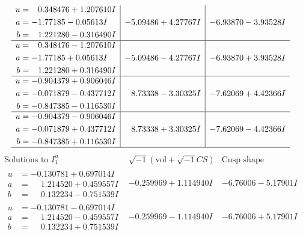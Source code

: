 \documentclass[1p]{elsarticle_modified}
\theoremstyle{definition}
\newcommand{\I}{\sqrt{-1}}
\begin{document}
$$\begin{array}{c|c|c}
\begin{aligned}
u &= \phantom{-}0.348476 + 1.207610 I \\
a &= -1.77185 - 0.05613 I \\
b &= \phantom{-}1.221280 - 0.316490 I\end{aligned}
 & -5.09486 + 4.27767 I & -6.93870 - 3.93528 I \\ \hline\begin{aligned}
u &= \phantom{-}0.348476 - 1.207610 I \\
a &= -1.77185 + 0.05613 I \\
b &= \phantom{-}1.221280 + 0.316490 I\end{aligned}
 & -5.09486 - 4.27767 I & -6.93870 + 3.93528 I \\ \hline\begin{aligned}
u &= -0.904379 + 0.906046 I \\
a &= -0.071879 - 0.437712 I \\
b &= -0.847385 - 0.116530 I\end{aligned}
 & \phantom{-}8.73338 - 3.30325 I & -7.62069 + 4.42366 I \\ \hline\begin{aligned}
u &= -0.904379 - 0.906046 I \\
a &= -0.071879 + 0.437712 I \\
b &= -0.847385 + 0.116530 I\end{aligned}
 & \phantom{-}8.73338 + 3.30325 I & -7.62069 - 4.42366 I\\
 \hline 
 \end{array}$$\newpage$$\begin{array}{c|c|c}  
\text{Solutions to }I^u_{1}& \I (\text{vol} + \sqrt{-1}CS) & \text{Cusp shape}\\
 \hline 
\begin{aligned}
u &= -0.130781 + 0.697014 I \\
a &= \phantom{-}1.214520 + 0.459557 I \\
b &= \phantom{-}0.132234 - 0.751539 I\end{aligned}
 & -0.259969 + 1.114940 I & -6.76006 - 5.17901 I \\ \hline\begin{aligned}
u &= -0.130781 - 0.697014 I \\
a &= \phantom{-}1.214520 - 0.459557 I \\
b &= \phantom{-}0.132234 + 0.751539 I\end{aligned}
 & -0.259969 - 1.114940 I & -6.76006 + 5.17901 I \\ \hline\begin{aligned}

\end{aligned}
\end{array}$$
\end{document}
